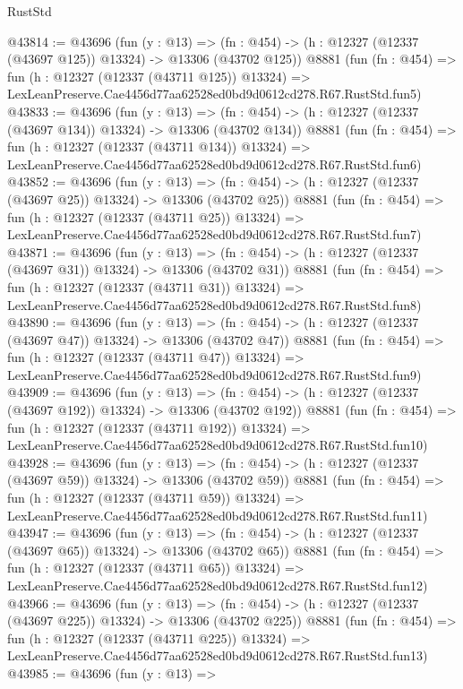 \begin{lexlean}{RustStd}
\begin{coremodule}
@43814 := @43696
    (fun (y : @13) =>
    (fn : @454) -> (h : @12327 (@12337 (@43697 @125)) @13324) -> @13306 (@43702 @125))
    @8881
    (fun (fn : @454) =>
    fun (h : @12327 (@12337 (@43711 @125)) @13324) =>
    LexLeanPreserve.Cae4456d77aa62528ed0bd9d0612cd278.R67.RustStd.fun5)
@43833 := @43696
    (fun (y : @13) =>
    (fn : @454) -> (h : @12327 (@12337 (@43697 @134)) @13324) -> @13306 (@43702 @134))
    @8881
    (fun (fn : @454) =>
    fun (h : @12327 (@12337 (@43711 @134)) @13324) =>
    LexLeanPreserve.Cae4456d77aa62528ed0bd9d0612cd278.R67.RustStd.fun6)
@43852 := @43696
    (fun (y : @13) =>
    (fn : @454) -> (h : @12327 (@12337 (@43697 @25)) @13324) -> @13306 (@43702 @25))
    @8881
    (fun (fn : @454) =>
    fun (h : @12327 (@12337 (@43711 @25)) @13324) =>
    LexLeanPreserve.Cae4456d77aa62528ed0bd9d0612cd278.R67.RustStd.fun7)
@43871 := @43696
    (fun (y : @13) =>
    (fn : @454) -> (h : @12327 (@12337 (@43697 @31)) @13324) -> @13306 (@43702 @31))
    @8881
    (fun (fn : @454) =>
    fun (h : @12327 (@12337 (@43711 @31)) @13324) =>
    LexLeanPreserve.Cae4456d77aa62528ed0bd9d0612cd278.R67.RustStd.fun8)
@43890 := @43696
    (fun (y : @13) =>
    (fn : @454) -> (h : @12327 (@12337 (@43697 @47)) @13324) -> @13306 (@43702 @47))
    @8881
    (fun (fn : @454) =>
    fun (h : @12327 (@12337 (@43711 @47)) @13324) =>
    LexLeanPreserve.Cae4456d77aa62528ed0bd9d0612cd278.R67.RustStd.fun9)
@43909 := @43696
    (fun (y : @13) =>
    (fn : @454) -> (h : @12327 (@12337 (@43697 @192)) @13324) -> @13306 (@43702 @192))
    @8881
    (fun (fn : @454) =>
    fun (h : @12327 (@12337 (@43711 @192)) @13324) =>
    LexLeanPreserve.Cae4456d77aa62528ed0bd9d0612cd278.R67.RustStd.fun10)
@43928 := @43696
    (fun (y : @13) =>
    (fn : @454) -> (h : @12327 (@12337 (@43697 @59)) @13324) -> @13306 (@43702 @59))
    @8881
    (fun (fn : @454) =>
    fun (h : @12327 (@12337 (@43711 @59)) @13324) =>
    LexLeanPreserve.Cae4456d77aa62528ed0bd9d0612cd278.R67.RustStd.fun11)
@43947 := @43696
    (fun (y : @13) =>
    (fn : @454) -> (h : @12327 (@12337 (@43697 @65)) @13324) -> @13306 (@43702 @65))
    @8881
    (fun (fn : @454) =>
    fun (h : @12327 (@12337 (@43711 @65)) @13324) =>
    LexLeanPreserve.Cae4456d77aa62528ed0bd9d0612cd278.R67.RustStd.fun12)
@43966 := @43696
    (fun (y : @13) =>
    (fn : @454) -> (h : @12327 (@12337 (@43697 @225)) @13324) -> @13306 (@43702 @225))
    @8881
    (fun (fn : @454) =>
    fun (h : @12327 (@12337 (@43711 @225)) @13324) =>
    LexLeanPreserve.Cae4456d77aa62528ed0bd9d0612cd278.R67.RustStd.fun13)
@43985 := @43696
    (fun (y : @13) =>

\end{coremodule}
\end{lexlean}
